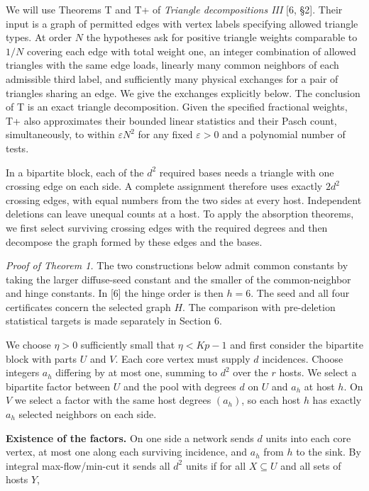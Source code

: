 \documentclass[english,11pt,a4paper]{article}
\begin{document}
We will use Theorems T and T+ of \emph{Triangle decompositions III} {[}6, §2{]}. Their input is a graph of permitted edges with vertex labels specifying allowed triangle types. At order \(N\) the hypotheses ask for positive triangle weights comparable to \(1/N\) covering each edge with total weight one, an integer combination of allowed triangles with the same edge loads, linearly many common neighbors of each admissible third label, and sufficiently many physical exchanges for a pair of triangles sharing an edge. We give the exchanges explicitly below. The conclusion of T is an exact triangle decomposition. Given the specified fractional weights, T+ also approximates their bounded linear statistics and their Pasch count, simultaneously, to within \(\varepsilon N^2\) for any fixed \(\varepsilon>0\) and a polynomial number of tests.

In a bipartite block, each of the \(d^2\) required bases needs a triangle with one crossing edge on each side. A complete assignment therefore uses exactly \(2d^2\) crossing edges, with equal numbers from the two sides at every host. Independent deletions can leave unequal counts at a host. To apply the absorption theorems, we first select surviving crossing edges with the required degrees and then decompose the graph formed by these edges and the bases.

\emph{Proof of Theorem 1.} The two constructions below admit common constants by taking the larger diffuse-seed constant and the smaller of the common-neighbor and hinge constants. In {[}6{]} the hinge order is then \(h=6\). The seed and all four certificates concern the selected graph \(H\). The comparison with pre-deletion statistical targets is made separately in Section 6.

We choose \(\eta>0\) sufficiently small that \(\eta<Kp-1\) and first consider the bipartite block with parts \(U\) and \(V\). Each core vertex must supply \(d\) incidences. Choose integers \(a_h\) differing by at most one, summing to \(d^2\) over the \(r\) hosts. We select a bipartite factor between \(U\) and the pool with degrees \(d\) on \(U\) and \(a_h\) at host \(h\). On \(V\) we select a factor with the same host degrees \((a_h)\), so each host \(h\) has exactly \(a_h\) selected neighbors on each side.

\textbf{Existence of the factors.} On one side a network sends \(d\) units into each core vertex, at most one along each surviving incidence, and \(a_h\) from \(h\) to the sink. By integral max-flow/min-cut it sends all \(d^2\) units if for all \(X\subseteq U\) and all sets of hosts \(Y\),
\end{document}
